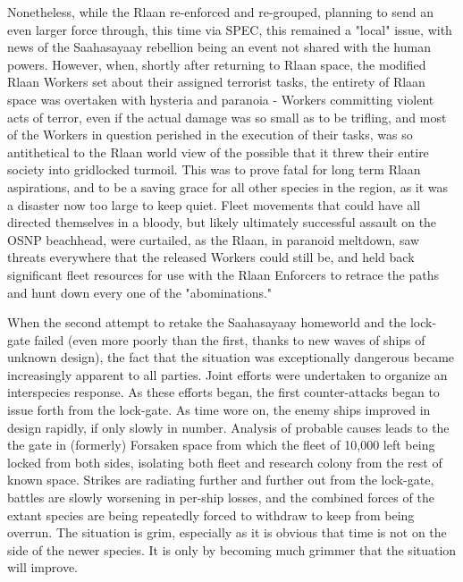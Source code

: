 Nonetheless, while the Rlaan re-enforced and re-grouped, planning to
send an even larger force through, this time via SPEC, this remained a
"local" issue, with news of the Saahasayaay rebellion being an event
not shared with the human powers. However, when, shortly after
returning to Rlaan space, the modified Rlaan Workers set about their
assigned terrorist tasks, the entirety of Rlaan space was overtaken
with hysteria and paranoia - Workers committing violent acts of
terror, even if the actual damage was so small as to be trifling, and
most of the Workers in question perished in the execution of their
tasks, was so antithetical to the Rlaan world view of the possible
that it threw their entire society into gridlocked turmoil. This was
to prove fatal for long term Rlaan aspirations, and to be a saving
grace for all other species in the region, as it was a disaster now
too large to keep quiet. Fleet movements that could have all directed
themselves in a bloody, but likely ultimately successful assault on
the OSNP beachhead, were curtailed, as the Rlaan, in paranoid
meltdown, saw threats everywhere that the released Workers could still
be, and held back significant fleet resources for use with the Rlaan
Enforcers to retrace the paths and hunt down every one of the
"abominations."

When the second attempt to retake the Saahasayaay homeworld and the
lock-gate failed (even more poorly than the first, thanks to new waves
of ships of unknown design), the fact that the situation was
exceptionally dangerous became increasingly apparent to all
parties. Joint efforts were undertaken to organize an interspecies
response. As these efforts began, the first counter-attacks began to
issue forth from the lock-gate. As time wore on, the enemy ships
improved in design rapidly, if only slowly in number. Analysis of
probable causes leads to the the gate in (formerly) Forsaken space
from which the fleet of 10,000 left being locked from both sides,
isolating both fleet and research colony from the rest of known
space. Strikes are radiating further and further out from the
lock-gate, battles are slowly worsening in per-ship losses, and the
combined forces of the extant species are being repeatedly forced to
withdraw to keep from being overrun. The situation is grim, especially
as it is obvious that time is not on the side of the newer species. It
is only by becoming much grimmer that the situation will improve.

